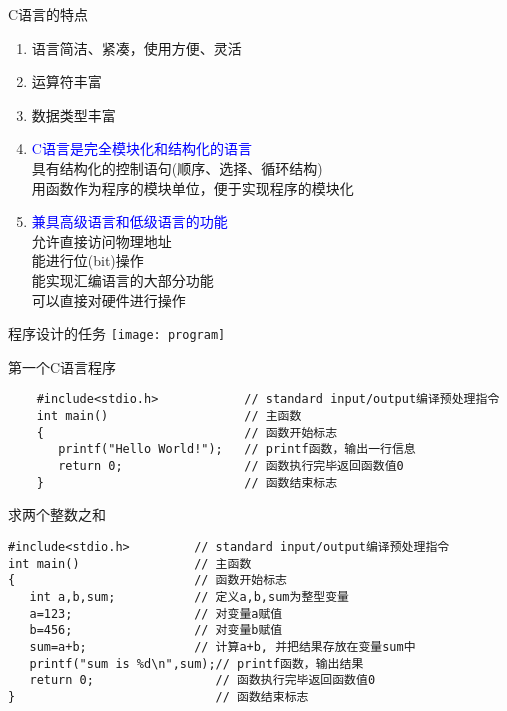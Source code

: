 \begin{frame}{C语言的特点}
\vspace{-0.5cm}
\begin{enumerate}
	\item 语言简洁、紧凑，使用方便、灵活
    \item 运算符丰富
    \item 数据类型丰富
    \item \textcolor{blue}{C语言是完全模块化和结构化的语言}\\
          具有结构化的控制语句(顺序、选择、循环结构)\\
          用函数作为程序的模块单位，便于实现程序的模块化
    \item \textcolor{blue}{兼具高级语言和低级语言的功能}\\
          允许直接访问物理地址\\
          能进行位(bit)操作\\  
          能实现汇编语言的大部分功能\\
          可以直接对硬件进行操作        
\end{enumerate}
\end{frame}

\begin{frame}{程序设计的任务}
\centering
\texttt{[image: program]}
\end{frame}

\begin{frame}[fragile]{第一个C语言程序}
    \begin{lstlisting}
    #include<stdio.h>            // standard input/output编译预处理指令
    int main()                   // 主函数
    {                            // 函数开始标志
       printf("Hello World!");   // printf函数，输出一行信息
       return 0;                 // 函数执行完毕返回函数值0
    }                            // 函数结束标志
    \end{lstlisting}
\end{frame}

\begin{frame}[fragile]{求两个整数之和}
\begin{lstlisting}
#include<stdio.h>         // standard input/output编译预处理指令
int main()                // 主函数
{                         // 函数开始标志
   int a,b,sum;           // 定义a,b,sum为整型变量
   a=123;                 // 对变量a赋值
   b=456;				  // 对变量b赋值
   sum=a+b;               // 计算a+b, 并把结果存放在变量sum中
   printf("sum is %d\n",sum);// printf函数，输出结果
   return 0;                 // 函数执行完毕返回函数值0
}                            // 函数结束标志
\end{lstlisting}
\end{frame}

